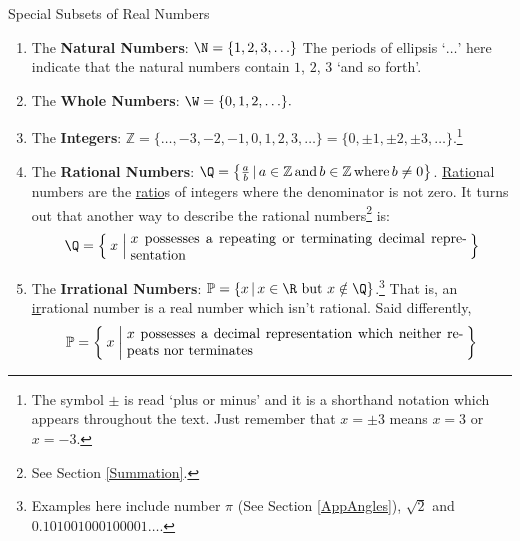 \begin{floatbox}[label=box:setsofnumbersboxonthispage]{Special Subsets of Real Numbers}


\begin{enumerate}[leftmargin=*]

\item The \textbf{Natural Numbers}: $\N= \{ 1, 2, 3,  \ldots\}$ The periods of ellipsis `$\ldots$' here indicate that the natural numbers contain $1$, $2$, $3$ `and so forth'.

\item The \textbf{Whole Numbers}: $\W = \{ 0, 1, 2, \ldots \}.$

\item The \textbf{Integers}: $\mathbb Z=\{ \ldots, -3, -2, -1, 0, 1, 2, 3, \ldots \} = \{ 0, \pm 1, \pm 2, \pm 3, \ldots\}.$\footnote{The symbol $\pm$ is read `plus or minus' and it is a shorthand notation which appears throughout the text.  Just remember that $x = \pm 3$ means $x = 3$ or $x = -3$.}

\item The \textbf{Rational Numbers}: $\Q=\left\{\frac{a}{b} \, | \, a \in \mathbb Z \, \mbox{and} \, b \in \mathbb Z \, \mbox{where} \, b \neq 0\right\}$.  \underline{Ratio}nal numbers are the \underline{ratio}s of integers where the denominator is not zero.  It turns out that another way to describe the rational numbers\footnote{See Section \ref{Summation}.} is: \[\Q=\Set{x | \parbox{0.7\linewidth}{$x$ possesses a repeating or terminating decimal representation}}\]

\item The \textbf{Irrational Numbers}: $\mathbb P = \{x\,|\,\mbox{$x \in \R$ but $x \notin \Q$}\}$.\footnote{Examples here include number $\pi$ (See Section \ref{AppAngles}), $\sqrt{2}$ and $0.101001000100001\ldots$.}  That is, an \underline{ir}rational number is a real number which isn't rational.  Said differently, \[\mathbb P = \Set{x | \parbox{0.7\linewidth}{$x$ possesses a decimal representation which neither repeats nor terminates}}\]

\end{enumerate}
\end{floatbox}

